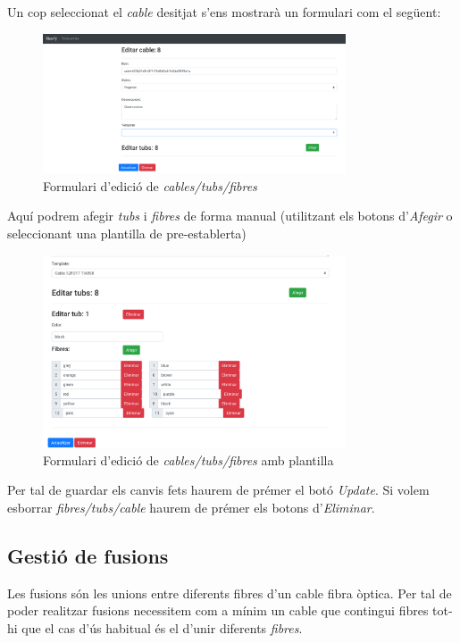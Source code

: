 \documentclass[a4paper]{article}
\begin{document}
	Un cop seleccionat el \emph{cable} desitjat s'ens mostrarà un formulari com el següent:
	\begin{figure}[H]
		\centering
		\includegraphics[width=0.8\textwidth]{images/cable_edit_form.png}
		\caption{Formulari d'edició de \emph{cables/tubs/fibres}}
	\end{figure}

	Aquí podrem afegir \emph{tubs} i \emph{fibres} de forma manual (utilitzant els botons d'\emph{Afegir} o seleccionant una plantilla de pre-establerta)
	
	\begin{figure}[H]
		\centering
		\includegraphics[width=0.8\textwidth]{images/cable_edit_form_template.png}
		\caption{Formulari d'edició de \emph{cables/tubs/fibres} amb plantilla}
	\end{figure}
	
	Per tal de guardar els canvis fets haurem de prémer el botó \emph{Update}. Si volem esborrar \emph{fibres/tubs/cable} haurem de prémer els botons d'\emph{Eliminar}.
	
	\subsection{Gestió de fusions}
	Les fusions són les unions entre diferents fibres d'un cable fibra òptica. Per tal de poder realitzar fusions necessitem com a mínim un cable que contingui fibres tot-hi que el cas d'ús habitual és el d'unir diferents \emph{fibres}.
	
\end{document}
